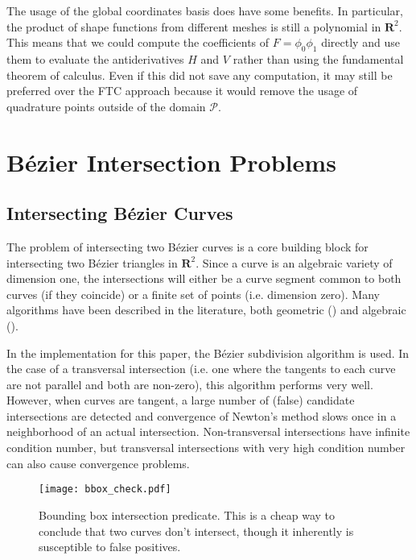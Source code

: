 \documentclass[letterpaper,10pt]{article}
\theoremstyle{definition}
\newcommand{\reals}{\mathbf{R}}
\begin{document}
The usage of the global coordinates basis does have some benefits.
In particular, the product of shape functions from different meshes
is still a polynomial in \(\reals^2\). This means that we could
compute the coefficients of \(F = \phi_0 \phi_1\) directly and
use them to evaluate the antiderivatives \(H\) and \(V\) rather
than using the fundamental theorem of calculus. Even if this
did not save any computation, it may still be preferred over
the FTC approach because it would remove the usage of quadrature
points outside of the domain \(\mathcal{P}\).




\appendix

\section{B\'{e}zier Intersection Problems}\label{sec:bezier-intersection}

\subsection{Intersecting B\'{e}zier Curves}

The problem of intersecting two B\'{e}zier curves is a core building
block for intersecting two B\'{e}zier triangles in \(\reals^2\).
Since a curve is an algebraic variety of dimension one,
the intersections will either be a curve segment common to both curves (if
they coincide) or a finite set of points (i.e. dimension zero).
Many algorithms have been described in the literature, both
geometric (\cite{Sederberg1986, Sederberg1990, Kim1998}) and
algebraic (\cite{Manocha:CSD-92-698}).

In the implementation for this paper, the B\'{e}zier subdivision
algorithm is used.
In the case of a transversal intersection (i.e. one where the
tangents to each curve are not parallel and both are non-zero),
this algorithm performs very well. However, when curves are tangent,
a large number of (false) candidate intersections are detected and
convergence of Newton's method slows once in a neighborhood of an
actual intersection. Non-transversal intersections
have infinite condition number, but transversal intersections with
very high condition number can also cause convergence problems.

\begin{figure}
  \texttt{[image: bbox\_check.pdf]}
  \centering
  \captionsetup{width=.75\linewidth}
  \caption{Bounding box intersection predicate. This is a cheap way to
    conclude that two curves don't intersect, though it inherently is
    susceptible to false positives.}
  \label{fig:bounding-box-check}
\end{figure}
\end{document}
